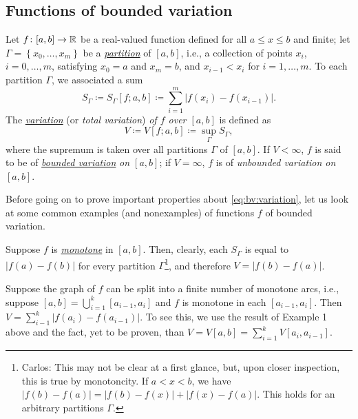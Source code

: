 \subsection{Functions of bounded variation}
Let $f\colon[a,b]\to\mathbb{R}$ be a real-valued function defined for all $a\leq
x\leq b$ and finite; let $\Gamma=\left\{x_0,\dotsc,x_m\right\}$ be a
\href{https://en.wikipedia.org/wiki/Partition_of_an_interval}{\emph{partition}}
of $[a,b]$, i.e., a collection of points $x_i$, $i=0,\dotsc,m$, satisfying
$x_0=a$ and $x_m=b$, and $x_{i-1}<x_i$ for $i=1,\dotsc,m$. To each
partition $\Gamma$, we associated a sum
\begin{equation}
\label{eq:bv:sum}
S_\Gamma\coloneqq S_\Gamma[f;a,b]\coloneqq\sum_{i=1}^m\left|f(x_i)-f(x_{i-1})\right|.
\end{equation}
The
\href{https://en.wikipedia.org/wiki/Bounded_variation#Formal_definition}{\emph{variation}}
(or \emph{total variation}) \emph{of $f$ over $[a,b]$} is defined as
\begin{equation}
  \label{eq:bv:variation}
V\coloneqq V[f;a,b]\coloneqq\sup_\Gamma S_\Gamma,
\end{equation}
where the supremum is taken over all partitions $\Gamma$ of $[a,b]$. If
$V<\infty$, $f$ is said to be of
\href{https://en.wikipedia.org/wiki/Bounded_variation}{\emph{bounded
    variation}} \emph{on $[a,b]$}; if $V=\infty$, $f$ is of \emph{unbounded
variation on $[a,b]$}.

Before going on to prove important properties about
\eqref{eq:bv:variation}, let us look at some common examples (and
nonexamples) of functions $f$ of bounded variation.

\begin{example}
Suppose $f$ is
\href{https://en.wikipedia.org/wiki/Monotonic_function}{\emph{monotone}} in
$[a,b]$. Then, clearly, each $S_\Gamma$ is equal to $|f(a)-f(b)|$ for every
partition $\Gamma$\footnote{Carlos: This may not be clear at
  a first glance, but, upon closer inspection, this is true by
  monotoncity. If $a<x<b$, we have
  $|f(b)-f(a)|=|f(b)-f(x)|+|f(x)-f(a)|$. This holds for an arbitrary
  partitions $\Gamma$.}, and therefore $V=|f(b)-f(a)|$.
\end{example}
\begin{example}
Suppose the graph of $f$ can be split into a finite number of monotone
arcs, i.e., suppose $[a,b]=\bigcup_{i=1}^k [a_{i-1},a_i]$ and $f$ is
monotone in each $[a_{i-1},a_i]$. Then
$V=\sum_{i-1}^k|f(a_i)-f(a_{i-1})|$. To see this, we use the result of
Example 1 above and the fact, yet to be proven, than $V=V[a,b]=\sum_{i=1}^k
V[a_i,a_{i-1}]$.
\end{example}

